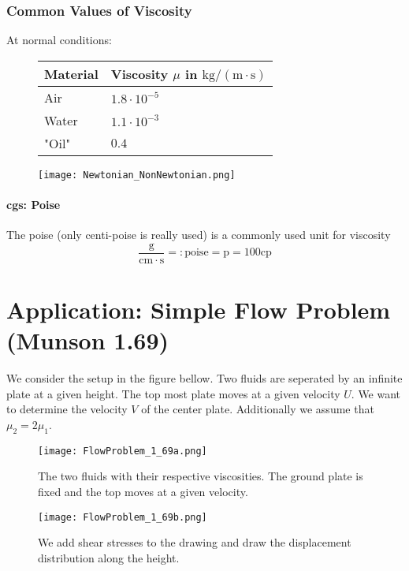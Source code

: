 \subsubsection{Common Values of Viscosity}
At normal conditions:
\begin{figure}[H]
    \begin{minipage}{0.45\textwidth}
        \centering
        \begin{tabular}{ll}
        \textbf{Material} & \textbf{Viscosity $\mu$ in $\mathrm{kg}/(\mathrm m\cdot \mathrm s)$}\\
        \hline
        Air      & $1.8\cdot 10^{-5}$                         \\
        \hline
        Water    & $1.1\cdot 10^{-3}$                          \\
        \hline
        "Oil"    & $0.4$                       
        \end{tabular}

    \end{minipage}
    \hfill
    \begin{minipage}{0.45\textwidth}
        \centering
        \texttt{[image: Newtonian\_NonNewtonian.png]}

    \end{minipage}
\end{figure}

\paragraph{cgs: Poise}
The poise (only centi-poise is really used) is a commonly used unit for viscosity
$$
\frac{\mathrm g}{\mathrm{cm}\cdot\mathrm s} =: \mathrm{poise} = \mathrm p = 100 \mathrm{cp}
$$

\section{Application: Simple Flow Problem (Munson 1.69)}
We consider the setup in the figure bellow. Two fluids are seperated by an infinite plate at a given height. The top most plate moves at a given velocity $U$. We want to determine the velocity $V$ of the center plate. Additionally we assume that $\mu_2=2\mu_1$.

\begin{figure}[H]
    \begin{minipage}{0.45\textwidth}   
                \centering
            \texttt{[image: FlowProblem\_1\_69a.png]}
            \caption{The two fluids with their respective viscosities. The ground plate is fixed and the top moves at a given velocity.}            
    \end{minipage}
    \hfill
    \begin{minipage}{0.45\textwidth}
        \centering
        \texttt{[image: FlowProblem\_1\_69b.png]}
        \caption{We add shear stresses to the drawing and draw the displacement distribution along the height.}
    \end{minipage}
\end{figure}

